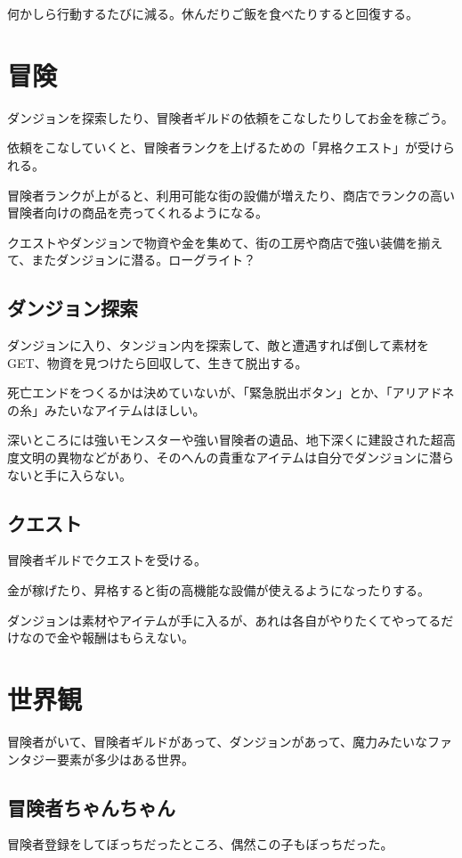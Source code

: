 \documentclass{mynote}
\begin{document}
何かしら行動するたびに減る。休んだりご飯を食べたりすると回復する。

\section{冒険}
ダンジョンを探索したり、冒険者ギルドの依頼をこなしたりしてお金を稼ごう。

依頼をこなしていくと、冒険者ランクを上げるための「昇格クエスト」が受けられる。

冒険者ランクが上がると、利用可能な街の設備が増えたり、商店でランクの高い冒険者向けの商品を売ってくれるようになる。

クエストやダンジョンで物資や金を集めて、街の工房や商店で強い装備を揃えて、またダンジョンに潜る。ローグライト？

\subsection{ダンジョン探索}
ダンジョンに入り、タンジョン内を探索して、敵と遭遇すれば倒して素材をGET、物資を見つけたら回収して、生きて脱出する。

死亡エンドをつくるかは決めていないが、「緊急脱出ボタン」とか、「アリアドネの糸」みたいなアイテムはほしい。

深いところには強いモンスターや強い冒険者の遺品、地下深くに建設された超高度文明の異物などがあり、そのへんの貴重なアイテムは自分でダンジョンに潜らないと手に入らない。

\subsection{クエスト}
冒険者ギルドでクエストを受ける。

金が稼げたり、昇格すると街の高機能な設備が使えるようになったりする。

ダンジョンは素材やアイテムが手に入るが、あれは各自がやりたくてやってるだけなので金や報酬はもらえない。

\section{世界観}
冒険者がいて、冒険者ギルドがあって、ダンジョンがあって、魔力みたいなファンタジー要素が多少はある世界。

\subsection{冒険者ちゃんちゃん}
冒険者登録をしてぼっちだったところ、偶然この子もぼっちだった。
\end{document}

